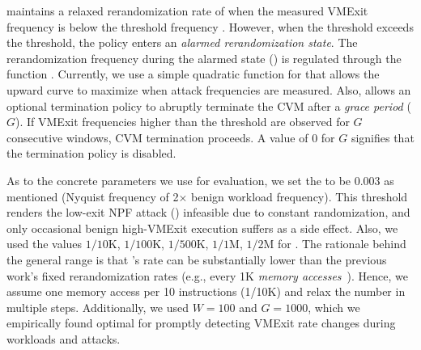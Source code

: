 \thename maintains a relaxed rerandomization rate of  when the measured VMExit frequency is below the threshold frequency .
However, when the threshold exceeds the threshold, the policy enters an \emph{alarmed rerandomization state}.
The rerandomization frequency during the alarmed state () is regulated through the function \rerandfunc.
Currently, we use a simple quadratic function for \rerandfunc that allows the  upward curve to maximize when attack frequencies are measured.
Also, \thename allows an optional termination policy to abruptly terminate the CVM after a \emph{grace period} ($G$).
If VMExit frequencies higher than the threshold  are observed for $G$ consecutive windows, CVM termination proceeds.
A value of $0$ for $G$ signifies that the termination policy is disabled.





\label{subsec:policy-parameters}
As to the concrete parameters we use for evaluation, we set the  to be $0.003$ as mentioned (Nyquist frequency of 2$\times$ benign workload frequency).
This threshold renders the low-exit NPF attack (\llenpf) infeasible due to constant randomization, and only occasional benign high-VMExit execution suffers as a side effect.
Also, we used the values $1/10$K, $1/100$K, $1/500$K, $1/1$M, $1/2$M for .
The rationale behind the general range is that \thename's rate can be substantially lower than the previous work's fixed rerandomization rates (e.g., every 1K \emph{memory accesses}~\cite{zhang2020klotski}).
Hence, we assume one memory access per 10 instructions (1/10K) and relax the number in multiple steps.
Additionally, we used $W=100$ and $G=1000$, which we empirically found optimal for promptly detecting VMExit rate changes during workloads and attacks.
